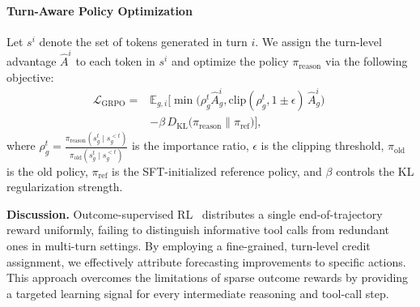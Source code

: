 \documentclass[11pt]{article}
\newcommand{\minisection}[1]{\vspace{5pt}\noindent\textbf{#1.}}
\begin{document}
\paragraph{Turn-Aware Policy Optimization}
Let $s^i$ denote the set of tokens generated in turn $i$.
We assign the turn-level advantage $\hat{A}^i$ to each token in $s^i$ and optimize the policy $\pi_{\mathrm{reason}}$ via the following objective:
\begin{equation}
\begin{split}
    \mathcal{L}_{\mathrm{GRPO}}
    = &\mathbb{E}_{g, i}\biggl[
    \min\!\bigl(\rho_g^t \hat{A}^i_g, \mathrm{clip}(\rho_g^t, 1\!\pm\!\epsilon)\,\hat{A}_g^i\bigr)\; \\
    & - \beta\, D_{\mathrm{KL}}\!\bigl(\pi_{\mathrm{reason}} \| \pi_{\mathrm{ref}}\bigr)\biggr],
\end{split}
\end{equation}
where $\rho^t_g = \frac{\pi_{\mathrm{reason}}(s^t_g \mid s^{<t}_g)}{\pi_{\mathrm{old}}(s^t_g \mid s^{<t}_g)}$ is the importance ratio, $\epsilon$ is the clipping threshold, $\pi_{\mathrm{old}}$ is the old policy, $\pi_{\mathrm{ref}}$ is the SFT-initialized reference policy, and $\beta$ controls the KL regularization strength.

\minisection{Discussion}
Outcome-supervised RL~\citep{shao2024deepseekmath} distributes a single end-of-trajectory reward uniformly, failing to distinguish informative tool calls from redundant ones in multi-turn settings.
By employing a fine-grained, turn-level credit assignment, we effectively attribute forecasting improvements to specific actions.
This approach overcomes the limitations of sparse outcome rewards by providing a targeted learning signal for every intermediate reasoning and tool-call step.
\end{document}
